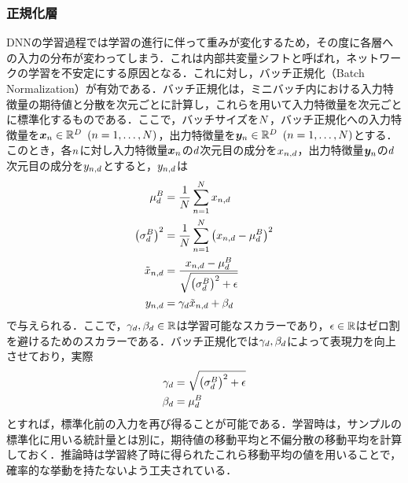 \subsubsection{正規化層}
DNNの学習過程では学習の進行に伴って重みが変化するため，その度に各層への入力の分布が変わってしまう．これは内部共変量シフトと呼ばれ，ネットワークの学習を不安定にする原因となる．これに対し，バッチ正規化（Batch Normalization）\cite{ioffe2015batch}が有効である．バッチ正規化は，ミニバッチ内における入力特徴量の期待値と分散を次元ごとに計算し，これらを用いて入力特徴量を次元ごとに標準化するものである．ここで，バッチサイズを$N$，バッチ正規化への入力特徴量を$\bm{x}_{n} \in \mathbb{R}^{D} ~ \left(n = 1, \ldots, N\right)$，出力特徴量を$\bm{y}_{n} \in \mathbb{R}^{D} ~ \left(n = 1, \ldots, N\right)$とする．このとき，各$n$に対し入力特徴量$\bm{x}_{n}$の$d$次元目の成分を$x_{n, d}$，出力特徴量$\bm{y}_{n}$の$d$次元目の成分を$y_{n, d}$とすると，$y_{n, d}$は
\begin{align}
    \mu^{B}_{d}                      & = \frac{1}{N} \sum_{n = 1}^{N} x_{n, d}                                  \\
    \left(\sigma^{B}_{d}\right)^{2}              & = \frac{1}{N} \sum_{n = 1}^{N} \left(x_{n, d} - \mu^{B}_{d}\right)^{2} \\
    \tilde{x}_{n, d} & = \frac{x_{n, d} - \mu^{B}_{d}}{\sqrt{\left(\sigma^{B}_{d}\right)^{2} + \epsilon}}       \\
    y_{n, d}        & = \gamma_{d} \tilde{x}_{n, d} +  \beta_{d}
\end{align}
で与えられる．ここで，$\gamma_{d}, \beta_{d} \in \mathbb{R}$は学習可能なスカラーであり，$\epsilon \in \mathbb{R}$はゼロ割を避けるためのスカラーである．バッチ正規化では$\gamma_{d}, \beta_{d}$によって表現力を向上させており，実際
\begin{align}
    \gamma_{d} & = \sqrt{\left(\sigma^{B}_{d}\right)^{2} + \epsilon} \\
    \beta_{d}      & = \mu^{B}_{d}
\end{align}
とすれば，標準化前の入力を再び得ることが可能である．学習時は，サンプルの標準化に用いる統計量とは別に，期待値の移動平均と不偏分散の移動平均を計算しておく．推論時は学習終了時に得られたこれら移動平均の値を用いることで，確率的な挙動を持たないよう工夫されている．


